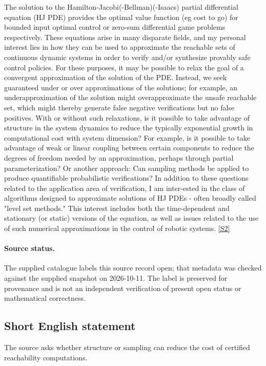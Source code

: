 \documentclass[11pt]{article}
\newcommand{\sref}[2]{\hyperlink{source:#1:#2}{[S#2]}}
\begin{document}
The solution to the Hamilton-Jacobi(-Bellman)(-Isaacs) partial differential equation (HJ PDE) provides the optimal value function (eg cost to go) for bounded input optimal control or zero-sum differential game problems respectively. These equations arise in many disparate fields, and my personal interest lies in how they can be used to approximate the reachable sets of continuous dynamic systems in order to verify and/or synthesize provably safe control policies. For these purposes, it may be possible to relax the goal of a convergent approximation of the solution of the PDE. Instead, we seek guaranteed under or over approximations of the solutions; for example, an underapproximation of the solution might overapproximate the unsafe reachable set, which might thereby generate false negative verifications but no false positives. With or without such relaxations, is it possible to take advantage of structure in the system dynamics to reduce the typically exponential growth in computational cost with system dimension? For example, is it possible to take advantage of weak or linear coupling between certain components to reduce the degrees of freedom needed by an approximation, perhaps through partial parameterization? Or another approach: Can sampling methods be applied to produce quantifiable probabilistic verifications? In addition to these questions related to the application area of verification, I am inter-ested in the class of algorithms designed to approximate solutions of HJ PDEs - often broadly called "level set methods." This interest includes both the time-dependent and stationary (or static) versions of the equation, as well as issues related to the use of such numerical approximations in the control of robotic systems. \sref{statement}{2}
\paragraph{Source status.}
The supplied catalogue labels this source record open; that metadata was checked against the supplied snapshot on 2026-10-11. The label is preserved for provenance and is not an independent verification of present open status or mathematical correctness.
\subsection{Short English statement}
The source asks whether structure or sampling can reduce the cost of certified reachability computations.
\end{document}
